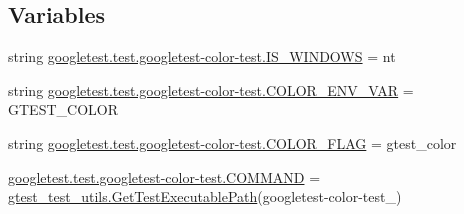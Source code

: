 \subsection*{Variables}
\begin{DoxyCompactItemize}
\item 
string \mbox{\hyperlink{namespacegoogletest_1_1test_1_1googletest-color-test_aef34789d18e129ea821954804d8b3d3f}{googletest.\+test.\+googletest-\/color-\/test.\+I\+S\+\_\+\+W\+I\+N\+D\+O\+WS}} = \textquotesingle{}nt\textquotesingle{}
\item 
string \mbox{\hyperlink{namespacegoogletest_1_1test_1_1googletest-color-test_a72dac9111105e74798e92748fa64fb67}{googletest.\+test.\+googletest-\/color-\/test.\+C\+O\+L\+O\+R\+\_\+\+E\+N\+V\+\_\+\+V\+AR}} = \textquotesingle{}G\+T\+E\+S\+T\+\_\+\+C\+O\+L\+OR\textquotesingle{}
\item 
string \mbox{\hyperlink{namespacegoogletest_1_1test_1_1googletest-color-test_a615e9e15eb62797875259a25fbe2d53c}{googletest.\+test.\+googletest-\/color-\/test.\+C\+O\+L\+O\+R\+\_\+\+F\+L\+AG}} = \textquotesingle{}gtest\+\_\+color\textquotesingle{}
\item 
\mbox{\hyperlink{namespacegoogletest_1_1test_1_1googletest-color-test_a4199007cdd1201fbacf3901e07c54930}{googletest.\+test.\+googletest-\/color-\/test.\+C\+O\+M\+M\+A\+ND}} = \mbox{\hyperlink{namespacegtest__test__utils_a89ed3717984a80ffbb7a9c92f71b86a2}{gtest\+\_\+test\+\_\+utils.\+Get\+Test\+Executable\+Path}}(\textquotesingle{}googletest-\/color-\/test\+\_\+\textquotesingle{})
\end{DoxyCompactItemize}
